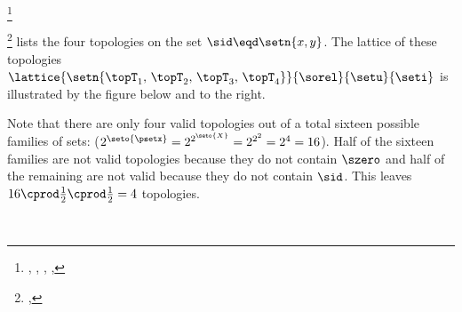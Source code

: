 \begin{theorem}
\footnote{
  ,
  ,  %
  , %
  , %
  }
\label{thm:ts_lattice_of_topologies}
\end{theorem}




\begin{example}
\label{ex:set_lat_top_xy}
\footnote{
  ,
  }%
 lists the four topologies on the set $\sid\eqd\setn{x,y}$.
The lattice of these topologies
$\lattice{\setn{\topT_1,\, \topT_2,\, \topT_3,\, \topT_4}}{\sorel}{\setu}{\seti}$
is illustrated by the figure below and to the right.
\\\begin{minipage}{\tw-75mm}%
Note that there are only four valid topologies out of a total sixteen
possible families of sets:
($2^{\seto{\psetx}} = 2^{2^{\seto{X}}} = 2^{2^2} = 2^4 = 16$).
Half of the sixteen families are not valid topologies because they do not contain $\szero$ 
and half of the remaining are not valid because they do not contain $\sid$.
This leaves $16 \cprod \frac{1}{2} \cprod \frac{1}{2} = 4$ topologies.
\end{minipage}%
\hfill{}\hfill\mbox{}\\%
\end{example}

